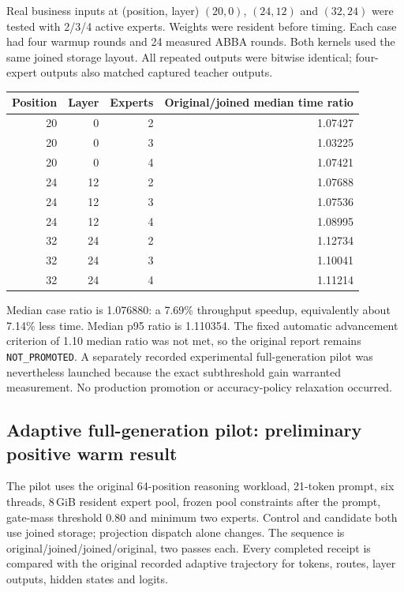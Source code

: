 Real business inputs at (position, layer) $(20,0)$, $(24,12)$ and $(32,24)$
were tested with 2/3/4 active experts. Weights were resident before timing.
Each case had four warmup rounds and 24 measured ABBA rounds. Both kernels
used the same joined storage layout. All repeated outputs were bitwise
identical; four-expert outputs also matched captured teacher outputs.
\begin{center}
\begin{tabular}{rrrr}
\toprule
Position & Layer & Experts & Original/joined median time ratio \\
\midrule
20 & 0 & 2 & 1.07427 \\
20 & 0 & 3 & 1.03225 \\
20 & 0 & 4 & 1.07421 \\
24 & 12 & 2 & 1.07688 \\
24 & 12 & 3 & 1.07536 \\
24 & 12 & 4 & 1.08995 \\
32 & 24 & 2 & 1.12734 \\
32 & 24 & 3 & 1.10041 \\
32 & 24 & 4 & 1.11214 \\
\bottomrule
\end{tabular}
\end{center}
Median case ratio is 1.076880: a 7.69\% throughput speedup, equivalently
about 7.14\% less time. Median p95 ratio is 1.110354. The fixed automatic
advancement criterion of 1.10 median ratio was not met, so the original
report remains \texttt{NOT\_PROMOTED}. A separately recorded experimental
full-generation pilot was nevertheless launched because the exact
subthreshold gain warranted measurement. No production promotion or
accuracy-policy relaxation occurred.

\subsection{Adaptive full-generation pilot: preliminary positive warm result}
The pilot uses the original 64-position reasoning workload, 21-token prompt,
six threads, 8\,GiB resident expert pool, frozen pool constraints after the
prompt, gate-mass threshold 0.80 and minimum two experts. Control and
candidate both use joined storage; projection dispatch alone changes.
The sequence is original/joined/joined/original, two passes each.
Every completed receipt is compared with the original recorded adaptive
trajectory for tokens, routes, layer outputs, hidden states and logits.

